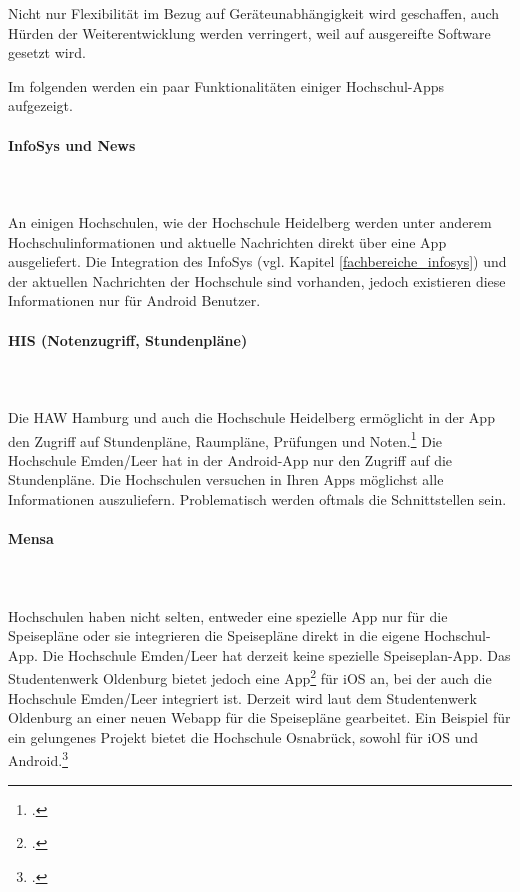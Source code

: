 Nicht nur Flexibilität im Bezug auf Geräteunabhängigkeit wird geschaffen, auch Hürden der Weiterentwicklung werden verringert, weil auf ausgereifte Software gesetzt wird.

Im folgenden werden ein paar Funktionalitäten einiger Hochschul-Apps aufgezeigt.

\paragraph{InfoSys und News}\mbox{}\\\\
An einigen Hochschulen, wie der Hochschule Heidelberg werden unter anderem Hochschulinformationen und aktuelle Nachrichten direkt über eine App ausgeliefert. Die Integration des InfoSys (vgl. Kapitel \ref{fachbereiche_infosys}) und der aktuellen Nachrichten der Hochschule sind vorhanden, jedoch existieren diese Informationen nur für Android Benutzer.

\paragraph{HIS (Notenzugriff, Stundenpläne)}\mbox{}\\\\
\label{paragraph_trends_his}
Die HAW Hamburg und auch die Hochschule Heidelberg ermöglicht in der App den Zugriff auf Stundenpläne, Raumpläne, Prüfungen und Noten.\footcite{akquinet_hawhamburg_2015} Die Hochschule Emden/Leer hat in der Android-App nur den Zugriff auf die Stundenpläne. Die Hochschulen versuchen in Ihren Apps möglichst alle Informationen auszuliefern. Problematisch werden oftmals die Schnittstellen sein. 

\paragraph{Mensa}\mbox{}\\\\ 
Hochschulen haben nicht selten, entweder eine spezielle App nur für die Speisepläne oder sie integrieren die Speisepläne direkt in die eigene Hochschul-App. Die Hochschule Emden/Leer hat derzeit keine spezielle Speiseplan-App. Das Studentenwerk Oldenburg bietet jedoch eine App\footcite{korte_mensaplanol_2009} für iOS an, bei der auch die Hochschule Emden/Leer integriert ist. Derzeit wird laut dem Studentenwerk Oldenburg an einer neuen Webapp für die Speisepläne gearbeitet. Ein Beispiel für ein gelungenes Projekt bietet die Hochschule Osnabrück, sowohl für iOS und Android.\footcite{ncn_studentenfutter_2013}

